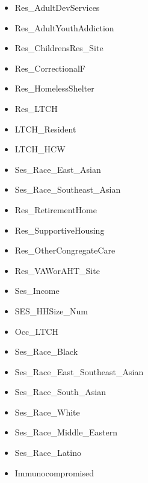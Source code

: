 \documentclass{article}
\begin{document}
\begin{itemize}
    \item Res\_AdultDevServices
    \item Res\_AdultYouthAddiction
    \item Res\_ChildrensRes\_Site
    \item Res\_CorrectionalF
    \item Res\_HomelessShelter
    \item Res\_LTCH
    \item LTCH\_Resident
    \item LTCH\_HCW
    \item Ses\_Race\_East\_Asian
    \item Ses\_Race\_Southeast\_Asian
    \item Res\_RetirementHome
    \item Res\_SupportiveHousing
    \item Res\_OtherCongregateCare
    \item Res\_VAWorAHT\_Site
    \item Ses\_Income
    \item SES\_HHSize\_Num
    \item Occ\_LTCH
    \item Ses\_Race\_Black
    \item Ses\_Race\_East\_Southeast\_Asian
    \item Ses\_Race\_South\_Asian
    \item Ses\_Race\_White
    \item Ses\_Race\_Middle\_Eastern
    \item Ses\_Race\_Latino
    \item Immunocompromised
\end{itemize}



\end{document}
